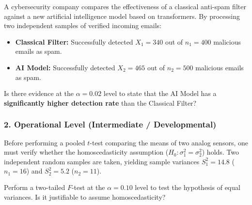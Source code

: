 \begin{problema}
	\label{prob:doc_dos_proporciones}
	A cybersecurity company compares the effectiveness of a classical anti-spam filter against a new artificial intelligence model based on transformers. By processing two independent samples of verified incoming emails:
	\begin{itemize}
		\item \textbf{Classical Filter:} Successfully detected $X_1 = 340$ out of $n_1 = 400$ malicious emails as spam.
		\item \textbf{AI Model:} Successfully detected $X_2 = 465$ out of $n_2 = 500$ malicious emails as spam.
	\end{itemize}
	Is there evidence at the $\alpha = 0.02$ level to state that the AI Model has a \textbf{significantly higher detection rate} than the Classical Filter?
\end{problema}

\subsubsection*{2. Operational Level (Intermediate / Developmental)}

\begin{problema}
	\label{prob:doc_dos_varianzas}
	Before performing a pooled $t$-test comparing the means of two analog sensors, one must verify whether the homoscedasticity assumption ($H_0: \sigma_1^2 = \sigma_2^2$) holds. Two independent random samples are taken, yielding sample variances $S_1^2 = 14.8$ ($n_1 = 16$) and $S_2^2 = 5.2$ ($n_2 = 11$).
	
	Perform a two-tailed $F$-test at the $\alpha = 0.10$ level to test the hypothesis of equal variances. Is it justifiable to assume homoscedasticity?
\end{problema}

